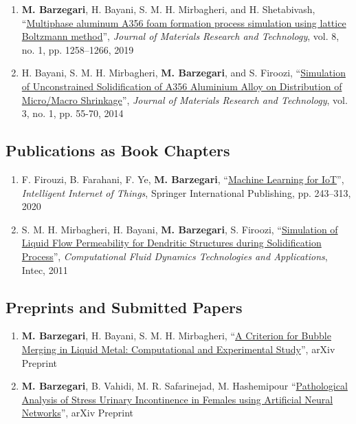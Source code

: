 \documentclass{cv}
\begin{document}
\begin{enumerate}
\item
\textbf{M. Barzegari}, H. Bayani, S. M. H. Mirbagheri, and H. Shetabivash, “\href{https://doi.org/10.1016/j.jmrt.2018.03.010}{Multiphase aluminum A356 foam formation process simulation using lattice Boltzmann method}'', \textit{Journal of Materials Research and Technology}, vol. 8, no. 1, pp. 1258–1266, 2019
\item
H. Bayani, S. M. H. Mirbagheri, \textbf{M. Barzegari}, and S. Firoozi, ``\href{http://www.sciencedirect.com/science/article/pii/S2238785413001129}{Simulation of Unconstrained Solidification of A356 Aluminium Alloy on Distribution of Micro/Macro Shrinkage}'', \textit{Journal of Materials Research and Technology}, vol. 3, no. 1, pp. 55-70, 2014
\end{enumerate}

\subsection{Publications as Book Chapters}

\begin{enumerate}
\item
F. Firouzi, B. Farahani, F. Ye, \textbf{M. Barzegari}, “\href{https://link.springer.com/chapter/10.1007\%2F978-3-030-30367-9_5}{Machine Learning for IoT}'', \textit{Intelligent Internet of Things}, Springer International Publishing, pp. 243–313, 2020
\item
S. M. H. Mirbagheri, H. Bayani, \textbf{M. Barzegari}, S. Firoozi, ``\href{https://www.intechopen.com/books/computational-fluid-dynamics-technologies-and-applications/simulation-of-liquid-flow-permeability-for-dendritic-structures-during-solidification-process}{Simulation of Liquid Flow Permeability for Dendritic Structures during Solidification Process}'', \textit{Computational Fluid Dynamics Technologies and Applications}, Intec, 2011
\end{enumerate}

\subsection{Preprints and Submitted Papers}
\begin{enumerate}
\item
\textbf{M. Barzegari}, H. Bayani, S. M. H. Mirbagheri, ``\href{https://arxiv.org/abs/1708.01608}{A Criterion for Bubble Merging in Liquid Metal: Computational and Experimental Study}'', arXiv Preprint
\item
\textbf{M. Barzegari}, B. Vahidi, M. R. Safarinejad, M. Hashemipour ``\href{https://arxiv.org/abs/1803.01843}{Pathological Analysis of Stress Urinary Incontinence in Females using Artificial Neural Networks}'', arXiv Preprint
\end{enumerate}
\end{document}
